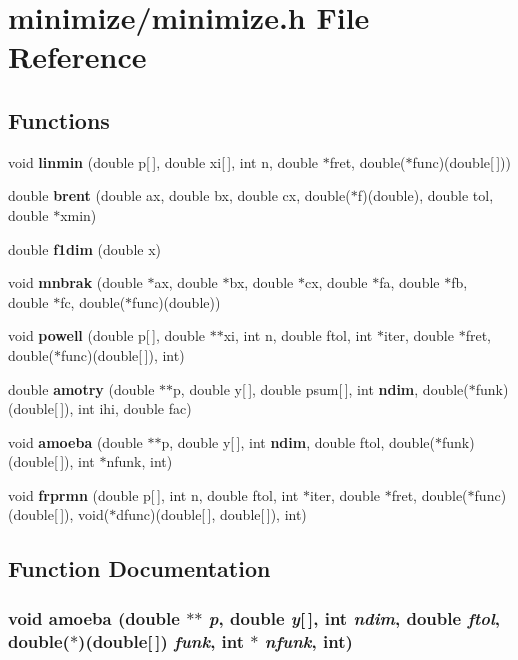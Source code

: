 \section{minimize/minimize.h File Reference}
\label{minimize_8h}
\subsection*{Functions}
\begin{CompactItemize}
\item 
void {\bf linmin} (double p[$\,$], double xi[$\,$], int n, double $\ast$fret, double($\ast$func)(double[$\,$]))
\item 
double {\bf brent} (double ax, double bx, double cx, double($\ast$f)(double), double tol, double $\ast$xmin)
\item 
double {\bf f1dim} (double x)
\item 
void {\bf mnbrak} (double $\ast$ax, double $\ast$bx, double $\ast$cx, double $\ast$fa, double $\ast$fb, double $\ast$fc, double($\ast$func)(double))
\item 
void {\bf powell} (double p[$\,$], double $\ast$$\ast$xi, int n, double ftol, int $\ast$iter, double $\ast$fret, double($\ast$func)(double[$\,$]), int)
\item 
double {\bf amotry} (double $\ast$$\ast$p, double y[$\,$], double psum[$\,$], int {\bf ndim}, double($\ast$funk)(double[$\,$]), int ihi, double fac)
\item 
void {\bf amoeba} (double $\ast$$\ast$p, double y[$\,$], int {\bf ndim}, double ftol, double($\ast$funk)(double[$\,$]), int $\ast$nfunk, int)
\item 
void {\bf frprmn} (double p[$\,$], int n, double ftol, int $\ast$iter, double $\ast$fret, double($\ast$func)(double[$\,$]), void($\ast$dfunc)(double[$\,$], double[$\,$]), int)
\end{CompactItemize}


\subsection{Function Documentation}
\subsubsection{\setlength{\rightskip}{0pt plus 5cm}void amoeba (double $\ast$$\ast$ {\em p}, double {\em y}[$\,$], int {\em ndim}, double {\em ftol}, double($\ast$)(double[$\,$]) {\em funk}, int $\ast$ {\em nfunk}, int)}\label{minimize_8h_f4201e64fb9198fc87b1e1047b54534c}


